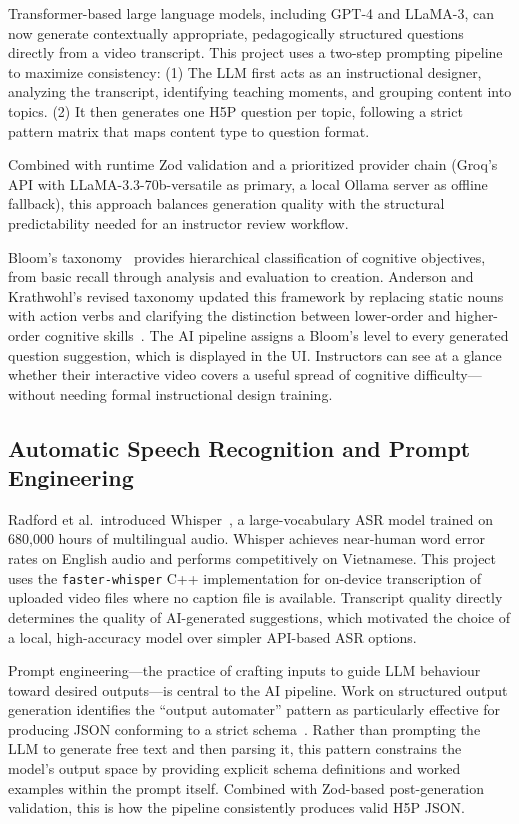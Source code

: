 Transformer-based large language models, including GPT-4 and LLaMA-3, can now generate contextually appropriate, pedagogically structured questions directly from a video transcript. This project uses a two-step prompting pipeline to maximize consistency:
(1) The LLM first acts as an instructional designer, analyzing the transcript, identifying teaching moments, and grouping content into topics.
(2) It then generates one H5P question per topic, following a strict pattern matrix that maps content type to question format.

Combined with runtime Zod validation and a prioritized provider chain (Groq's API with LLaMA-3.3-70b-versatile as primary, a local Ollama server as offline fallback), this approach balances generation quality with the structural predictability needed for an instructor review workflow.

Bloom's taxonomy~\cite{bloom1956} provides hierarchical classification of cognitive objectives, from basic recall through analysis and evaluation to creation. Anderson and Krathwohl's revised taxonomy updated this framework by replacing static nouns with action verbs and clarifying the distinction between lower-order and higher-order cognitive skills~\cite{anderson2001}. The AI pipeline assigns a Bloom's level to every generated question suggestion, which is displayed in the UI. Instructors can see at a glance whether their interactive video covers a useful spread of cognitive difficulty---without needing formal instructional design training.

\subsection{Automatic Speech Recognition and Prompt Engineering}

Radford et al.\ introduced Whisper~\cite{radford2023}, a large-vocabulary ASR model trained on 680,000 hours of multilingual audio. Whisper achieves near-human word error rates on English audio and performs competitively on Vietnamese. This project uses the \texttt{faster-whisper} C++ implementation for on-device transcription of uploaded video files where no caption file is available. Transcript quality directly determines the quality of AI-generated suggestions, which motivated the choice of a local, high-accuracy model over simpler API-based ASR options.

Prompt engineering---the practice of crafting inputs to guide LLM behaviour toward desired outputs---is central to the AI pipeline. Work on structured output generation identifies the ``output automater'' pattern as particularly effective for producing JSON conforming to a strict schema~\cite{white2023}. Rather than prompting the LLM to generate free text and then parsing it, this pattern constrains the model's output space by providing explicit schema definitions and worked examples within the prompt itself. Combined with Zod-based post-generation validation, this is how the pipeline consistently produces valid H5P JSON.

